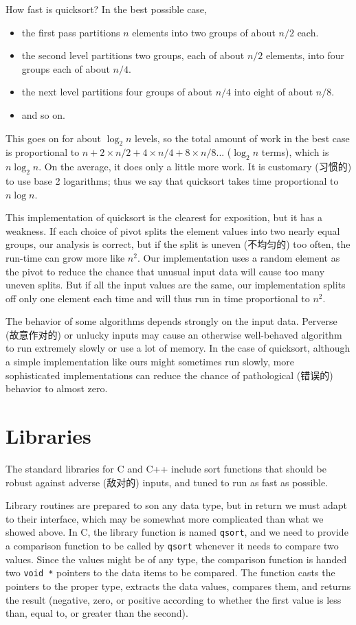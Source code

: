 How fast is quicksort? In the best possible case,
\begin{itemize}
\item the first pass partitions $n$ elements into two groups of about $n/2$
    each.
\item the second level partitions two groups, each of about $n/2$ elements,
    into four groups each of about $n/4$.
\item the next level partitions four groups of about $n/4$ into eight of
    about $n/8$.
\item and so on.
\end{itemize}

This goes on for about $\log_2 n$ levels, so the total amount of work in
the best case is proportional to $n + 2\times n/2 + 4\times n/4 + 8\times
n/8 ... $ ($\log_2 n$ terms), which is $n\log_2 n$. On the average, it does
only a little more work. It is customary (习惯的) to use base 2 logarithms;
thus we say that quicksort takes time proportional to $n\log n$.

This implementation of quicksort is the clearest for exposition, but it has
a weakness. If each choice of pivot splits the element values into two
nearly equal groups, our analysis is correct, but if the split is uneven
(不均匀的) too often, the run-time can grow more like $n^2$. Our
implementation uses a random element as the pivot to reduce the chance that
unusual input data will cause too many uneven splits. But if all the input
values are the same, our implementation splits off only one element each
time and will thus run in time proportional to $n^2$.

The behavior of some algorithms depends strongly on the input data.
Perverse (故意作对的) or unlucky inputs may cause an otherwise well-behaved
algorithm to run extremely slowly or use a lot of memory. In the case of
quicksort, although a simple implementation like ours might sometimes run
slowly, more sophisticated implementations can reduce the chance of
pathological (错误的) behavior to almost zero.

\section{Libraries}
\label{sec:libraries}

The standard libraries for C and C++ include sort functions that should be
robust against adverse (敌对的) inputs, and tuned to run as fast as
possible.

Library routines are prepared to son any data type, but in return we must
adapt to their interface, which may be somewhat more complicated than what
we showed above. In C, the library function is named \verb'qsort', and we
need to provide a comparison function to be called by \verb'qsort' whenever
it needs to compare two values. Since the values might be of any type, the
comparison function is handed two \verb'void *' pointers to the data
items to be compared. The function casts the pointers to the proper type,
extracts the data values, compares them, and returns the result (negative,
zero, or positive according to whether the first value is less than, equal
to, or greater than the second).

